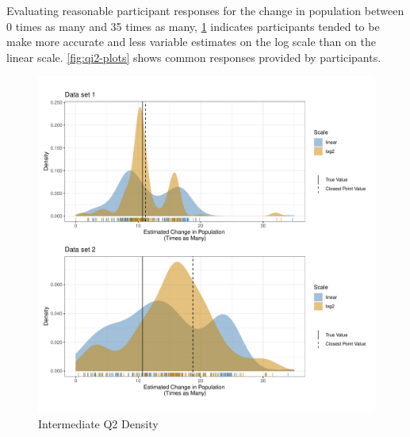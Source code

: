 \documentclass[print]{nuthesis}
\begin{document}
Evaluating reasonable participant responses for the change in population between 0 times as many and 35 times as many, \cref{fig:qi2-density} indicates participants tended to be make more accurate and less variable estimates on the log scale than on the linear scale.
\cref{fig:qi2-plots} shows common responses provided by participants.

\begin{figure}[tbp]

{\centering \includegraphics[width=1\linewidth,]{thesis_files/figure-latex/qi2-density-1} 

}

\caption{Intermediate Q2 Density}\label{fig:qi2-density}
\end{figure}
\end{document}
